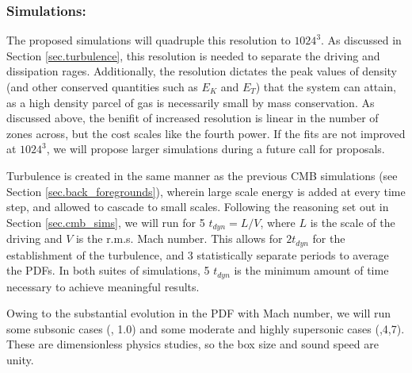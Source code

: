 \subsubsection{Simulations: \nameTurbulence}
\label{subsec.turb_sims}

The proposed simulations will quadruple this
resolution to $1024^3$.  As discussed in Section \ref{sec.turbulence},
this resolution is needed to separate the driving and dissipation rages.  
Additionally, the resolution dictates the peak values of density (and other
conserved quantities such as $E_K$ and $E_T$) that the system can attain, as a
high density parcel of gas is necessarily small by 
mass conservation.  As discussed above, the benifit of increased
resolution is linear in the number of zones across, but the cost scales like the
fourth power.  
If the
fits are not improved at $1024^3$, we will propose larger simulations during a
future call for proposals.

Turbulence is created in the same manner as the previous CMB simulations
(see Section \ref{sec.back_foregrounds}), wherein large scale energy is added at every time
step, and allowed to cascade to small scales.  Following the reasoning set out
in Section \ref{sec.cmb_sims}, we will run for 5 $t_{dyn}=L/V$, where $L$ is the
scale of the driving and $V$ is the r.m.s. Mach number.  This allows for $2
t_{dyn}$ for the establishment of the turbulence, and 3 statistically separate
periods to average the PDFs.  In both suites of simulations, 5 $t_{dyn}$ is the minimum
amount of time necessary to achieve meaningful results.

Owing to the substantial evolution in the PDF with Mach number, we
will run some subsonic cases (, 1.0) and some moderate and highly
supersonic cases (,4,7).   These are dimensionless physics
studies, so the box size and sound speed are unity.
